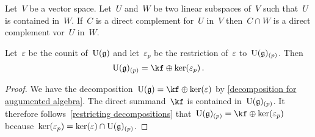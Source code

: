\begin{recall}
  \label{restricting decompositions}
  Let~$V$ be a vector space.
  Let~$U$ and~$W$ be two linear subspaces of~$V$ such that~$U$ is contained in~$W$.
  If~$C$ is a direct complement for~$U$ in~$V$ then~$C \cap W$ is a direct complement vor~$U$ in~$W$.
\end{recall}


\begin{lemma}
  \label{decomposition for restricted counit}
  Let~$\varepsilon$ be the counit of~$\operatorname{U}(\mathfrak{g})$ and let~$\varepsilon_p$ be the restriction of~$\varepsilon$ to~$\operatorname{U}(\mathfrak{g})_{(p)}$.
  Then
  \[
    \Univ(\glie)_{(p)}
    =
    \kf \oplus \ker(\varepsilon_p) \,.
  \]
\end{lemma}


\begin{proof}
  We have the decomposition~$\Univ(\glie) = \kf \oplus \ker(\varepsilon)$ by \cref{decomposition for augumented algebra}.
  The direct summand~$\kf$ is contained in~$\operatorname{U}(\mathfrak{g})_{(p)}$.
  It therefore follows~\cref{restricting decompositions} that~$\Univ(\glie)_{(p)} = \kf \oplus \ker(\varepsilon_p)$ because~$\ker(\varepsilon_p) = \ker(\varepsilon) \cap \operatorname{U}(\mathfrak{g})_{(p)}$.
\end{proof}


